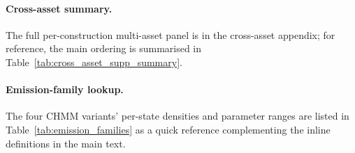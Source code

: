 \paragraph{Cross-asset summary.}
The full per-construction multi-asset panel is in the cross-asset appendix; for reference, the main ordering is summarised in Table~\ref{tab:cross_asset_supp_summary}.

\begin{table}[!ht]
\centering
\small
\caption{\textbf{Cross-asset dependence summary} (multi-asset construction; CHMM-N marginals at $K = 3$; $200$ paths; seed \texttt{20260422}). Median per-asset KS pass rate (\%) and off-diagonal MAE of the simulated correlation matrix vs.\ observed. Bold marks the column winner in the off-diagonal MAE columns only: the three copulas preserve the same CHMM-N marginals by rank reordering, so their per-asset KS medians differ only by Monte-Carlo path noise and no KS winner is marked. The Student-t copula at $\nu^\star = 6$ attains the lowest IS off-diagonal MAE; on OoS the Gaussian copula attains marginally lower off-diagonal MAE ($0.204$ vs.\ $0.209$) while the truncated C-vine sits between the elliptical copulas and the SIM baseline. Full per-asset detail is in the cross-asset appendix.}
\label{tab:cross_asset_supp_summary}
\end{table}

\paragraph{Emission-family lookup.}
The four CHMM variants' per-state densities and parameter ranges are listed in Table~\ref{tab:emission_families} as a quick reference complementing the inline definitions in the main text.

